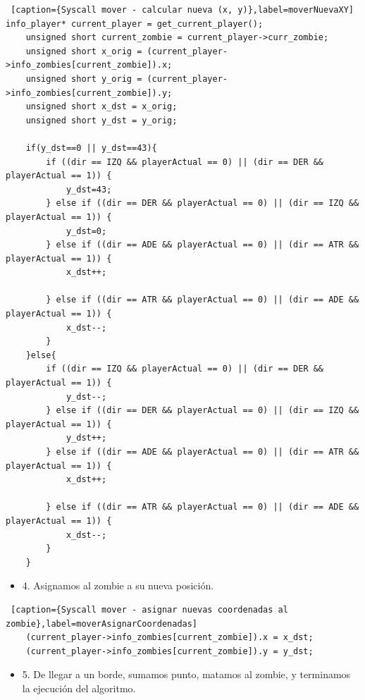 \begin{lstlisting} [caption={Syscall mover - calcular nueva (x, y)},label=moverNuevaXY]
info_player* current_player = get_current_player();
    unsigned short current_zombie = current_player->curr_zombie;
    unsigned short x_orig = (current_player->info_zombies[current_zombie]).x;
    unsigned short y_orig = (current_player->info_zombies[current_zombie]).y;
    unsigned short x_dst = x_orig;
    unsigned short y_dst = y_orig;

    if(y_dst==0 || y_dst==43){
        if ((dir == IZQ && playerActual == 0) || (dir == DER && playerActual == 1)) {
            y_dst=43;
        } else if ((dir == DER && playerActual == 0) || (dir == IZQ && playerActual == 1)) {
            y_dst=0;
        } else if ((dir == ADE && playerActual == 0) || (dir == ATR && playerActual == 1)) {
            x_dst++;

        } else if ((dir == ATR && playerActual == 0) || (dir == ADE && playerActual == 1)) {
            x_dst--;
        }
    }else{
        if ((dir == IZQ && playerActual == 0) || (dir == DER && playerActual == 1)) {
            y_dst--;
        } else if ((dir == DER && playerActual == 0) || (dir == IZQ && playerActual == 1)) {
            y_dst++;
        } else if ((dir == ADE && playerActual == 0) || (dir == ATR && playerActual == 1)) {
            x_dst++;

        } else if ((dir == ATR && playerActual == 0) || (dir == ADE && playerActual == 1)) {
            x_dst--;
        }
    }   

\end{lstlisting}

\begin{itemize}
\item 4. Asignamos al zombie a su nueva posici\'on.
\end{itemize}

\begin{lstlisting} [caption={Syscall mover - asignar nuevas coordenadas al zombie},label=moverAsignarCoordenadas]
    (current_player->info_zombies[current_zombie]).x = x_dst;
    (current_player->info_zombies[current_zombie]).y = y_dst;
\end{lstlisting}

\begin{itemize}
\item 5. De llegar a un borde, sumamos punto, matamos al zombie, y terminamos la ejecuci\'on del algoritmo.
\end{itemize}

